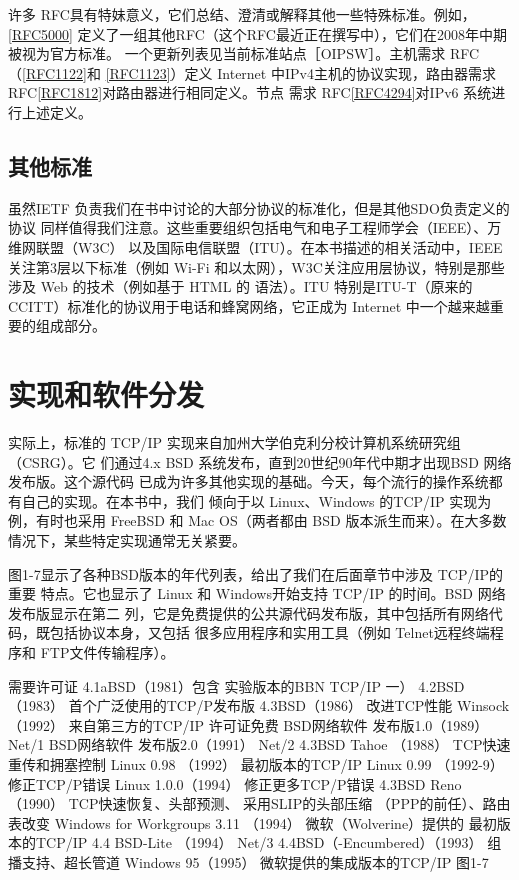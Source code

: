 许多 RFC具有特妹意义，它们总结、澄清或解释其他一些特殊标准。例如，\href{https://www.rfc-editor.org/rfc/rfc5000}{[RFC5000]}
定义了一组其他RFC（这个RFC最近正在撰写中），它们在2008年中期被视为官方标准。
一个更新列表见当前标准站点［OIPSW］。主机需求 RFC（\href{https://www.rfc-editor.org/rfc/rfc1122}{[RFC1122]}和 \href{https://www.rfc-editor.org/rfc/rfc1123}{[RFC1123]}）定义
Internet 中IPv4主机的协议实现，路由器需求 RFC\href{https://www.rfc-editor.org/rfc/rfc1812}{[RFC1812]}对路由器进行相同定义。节点
需求 RFC\href{https://www.rfc-editor.org/rfc/rfc4294}{[RFC4294]}对IPv6 系统进行上述定义。
\subsection{其他标准}
虽然IETF 负责我们在书中讨论的大部分协议的标准化，但是其他SDO负责定义的协议
同样值得我们注意。这些重要组织包括电气和电子工程师学会（IEEE）、万维网联盟（W3C）
以及国际电信联盟（ITU）。在本书描述的相关活动中，IEEE 关注第3层以下标准（例如
Wi-Fi 和以太网），W3C关注应用层协议，特别是那些涉及 Web 的技术（例如基于 HTML 的
语法）。ITU 特别是ITU-T（原来的CCITT）标准化的协议用于电话和蜂窝网络，它正成为
Internet 中一个越来越重要的组成部分。

\section{实现和软件分发}
实际上，标准的 TCP/IP 实现来自加州大学伯克利分校计算机系统研究组（CSRG）。它
们通过4.x BSD 系统发布，直到20世纪90年代中期才出现BSD 网络发布版。这个源代码
已成为许多其他实现的基础。今天，每个流行的操作系统都有自己的实现。在本书中，我们
倾向于以 Linux、Windows 的TCP/IP 实现为例，有时也采用 FreeBSD 和 Mac OS（两者都由
BSD 版本派生而来）。在大多数情况下，某些特定实现通常无关紧要。

图1-7显示了各种BSD版本的年代列表，给出了我们在后面章节中涉及 TCP/IP的重要
特点。它也显示了 Linux 和 Windows开始支持 TCP/IP 的时间。BSD 网络发布版显示在第二
列，它是免费提供的公共源代码发布版，其中包括所有网络代码，既包括协议本身，又包括
很多应用程序和实用工具（例如 Telnet远程终端程序和 FTP文件传输程序）。

需要许可证
4.1aBSD（1981）包含
实验版本的BBN TCP/IP
一）
4.2BSD （1983）
首个广泛使用的TCP/P发布版
4.3BSD（1986）
改进TCP性能
Winsock（1992）
来自第三方的TCP/IP
许可证免费
BSD网络软件
发布版1.0（1989）
Net/1
BSD网络软件
发布版2.0（1991）
Net/2
4.3BSD Tahoe （1988）
TCP快速重传和拥塞控制
Linux 0.98 （1992）
最初版本的TCP/IP
Linux 0.99 （1992-9）
修正TCP/P错误
Linux 1.0.0（1994）
修正更多TCP/P错误
4.3BSD Reno（1990）
TCP快速恢复、头部预测、
采用SLIP的头部压缩
（PPP的前任）、路由表改变
Windows for Workgroups 3.11 （1994）
微软（Wolverine）提供的
最初版本的TCP/IP
4.4 BSD-Lite （1994）
Net/3
4.4BSD（-Encumbered）（1993）
组播支持、超长管道
Windows 95（1995）
微软提供的集成版本的TCP/IP
图1-7

